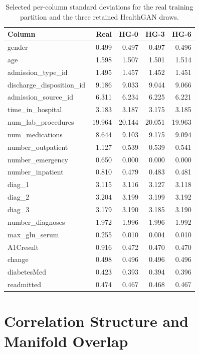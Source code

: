 \begin{table}[H]
\centering
\small
\caption{Selected per-column standard deviations for the real training
partition and the three retained HealthGAN draws.}
\label{app:tab:hg-std}
\begin{tabular}{lrrrr}
\toprule
Column & Real & HG-0 & HG-3 & HG-6 \\
\midrule
gender & 0.499 & 0.497 & 0.497 & 0.496 \\
age & 1.598 & 1.507 & 1.501 & 1.514 \\
admission\_type\_id & 1.495 & 1.457 & 1.452 & 1.451 \\
discharge\_disposition\_id & 9.186 & 9.033 & 9.044 & 9.066 \\
admission\_source\_id & 6.311 & 6.234 & 6.225 & 6.221 \\
time\_in\_hospital & 3.183 & 3.187 & 3.175 & 3.185 \\
num\_lab\_procedures & 19.964 & 20.144 & 20.051 & 19.963 \\
num\_medications & 8.644 & 9.103 & 9.175 & 9.094 \\
number\_outpatient & 1.127 & 0.539 & 0.539 & 0.541 \\
number\_emergency & 0.650 & 0.000 & 0.000 & 0.000 \\
number\_inpatient & 0.810 & 0.479 & 0.483 & 0.481 \\
diag\_1 & 3.115 & 3.116 & 3.127 & 3.118 \\
diag\_2 & 3.204 & 3.199 & 3.199 & 3.192 \\
diag\_3 & 3.179 & 3.190 & 3.185 & 3.190 \\
number\_diagnoses & 1.972 & 1.996 & 1.996 & 1.992 \\
max\_glu\_serum & 0.255 & 0.010 & 0.004 & 0.010 \\
A1Cresult & 0.916 & 0.472 & 0.470 & 0.470 \\
change & 0.498 & 0.496 & 0.496 & 0.496 \\
diabetesMed & 0.423 & 0.393 & 0.394 & 0.396 \\
readmitted & 0.474 & 0.467 & 0.468 & 0.467 \\
\bottomrule
\end{tabular}
\end{table}

\section{Correlation Structure and Manifold Overlap}
\label{app:hg-variants:corr-pca}

